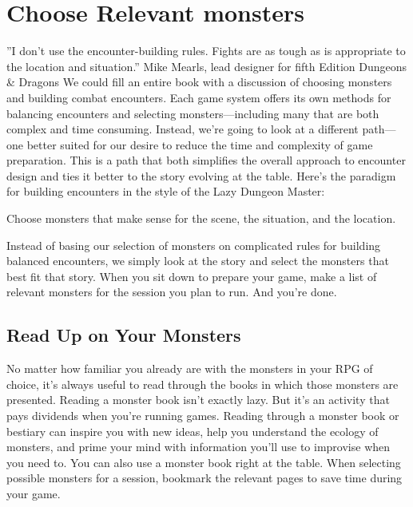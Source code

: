 \documentclass[10pt,a4paper,twoside,bg=print,twocolumn,openany,nodeprecatedcode]{dndbook}
\begin{document}
\section{Choose Relevant monsters}
\DndQuote%
{}
{''I don't use the encounter-building rules. Fights are as tough as is appropriate to the location and situation.''}
{Mike Mearls, lead designer for fifth Edition Dungeons & Dragons}
We could fill an entire book with a discussion of choosing monsters and building combat encounters. Each game system offers its own methods for balancing encounters and selecting monsters—including many that are both complex and time consuming.
Instead, we're going to look at a different path—one better suited for our desire to reduce the time and complexity of game preparation. This is a path that both simplifies the overall approach to encounter design and ties it better to the story evolving at the table. Here's the paradigm for building encounters in the style of the Lazy Dungeon Master:
\begin{DndSidebar}[float=!b]{}
Choose monsters that make sense for the scene, the situation, and the location.


\end{DndSidebar}

Instead of basing our selection of monsters on complicated rules for building balanced encounters, we simply look at the story and select the monsters that best fit that story.
When you sit down to prepare your game, make a list of relevant monsters for the session you plan to run. And you're done.
\subsection{Read Up on Your Monsters}
No matter how familiar you already are with the monsters in your RPG of choice, it's always useful to read through the books in which those monsters are presented. Reading a monster book isn't exactly lazy. But it's an activity that pays dividends when you're running games. Reading through a monster book or bestiary can inspire you with new ideas, help you understand the ecology of monsters, and prime your mind with information you'll use to improvise when you need to.
You can also use a monster book right at the table. When selecting possible monsters for a session, bookmark the relevant pages to save time during your game.
\end{document}
